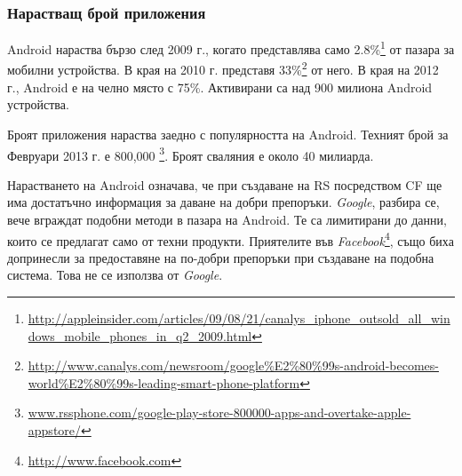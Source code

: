 		\subsubsection{Нарастващ брой приложения}
	
			Android нараства бързо след 2009 г., когато представлява само 2.8\%\footnote{\url{http://appleinsider.com/articles/09/08/21/canalys_iphone_outsold_all_windows_mobile_phones_in_q2_2009.html}} от пазара за мобилни устройства. В края на 2010 г. представя 33\%\footnote{\url{http://www.canalys.com/newsroom/google\%E2\%80\%99s-android-becomes-world\%E2\%80\%99s-leading-smart-phone-platform}} от него. В края на 2012 г., Android е на челно място с 75\%\cite{IDC}. Активирани са над 900 милиона Android устройства\cite{Google}.
			
			Броят приложения нараства заедно с популярността на Android. Техният брой за Февруари 2013 г. е 800,000 \footnote{\url{www.rssphone.com/google-play-store-800000-apps-and-overtake-apple-appstore/}}. Броят сваляния е около 40 милиарда.
			
			Нарастването на Android означава, че при създаване на \ac{RS} посредством \ac{CF} ще има достатъчно информация за даване на добри препоръки. \emph{Google}, разбира се, вече вграждат подобни методи в пазара на Android. Те са лимитирани до данни, които се предлагат само от техни продукти. Приятелите във \emph{Facebook}\footnote{\url{http://www.facebook.com}}, също биха допринесли за предоставяне на по-добри препоръки при създаване на подобна система. Това не се използва от \emph{Google}.
